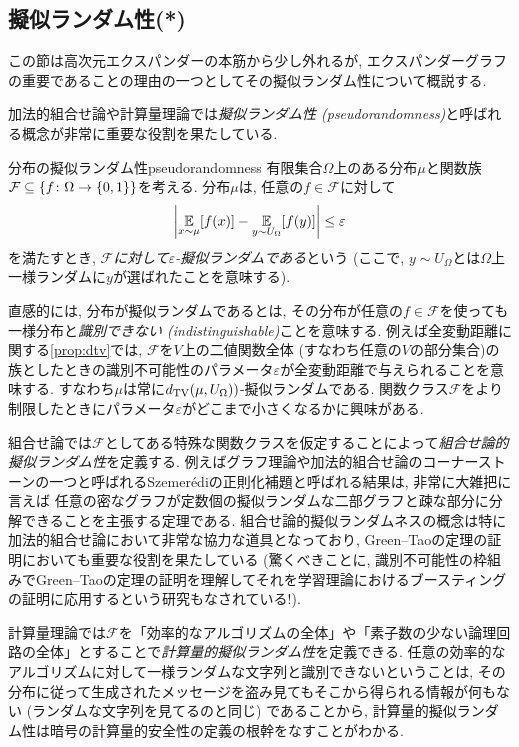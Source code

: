 \subsection{擬似ランダム性(*)} \label{sec:expander pseudorandom}
この節は高次元エクスパンダーの本筋から少し外れるが,
エクスパンダーグラフの重要であることの理由の一つとしてその擬似ランダム性について概説する.

加法的組合せ論や計算量理論では\emph{擬似ランダム性 (pseudorandomness)}と呼ばれる概念が非常に重要な役割を果たしている.
\begin{definition}{分布の擬似ランダム性}{pseudorandomness}
    有限集合$\Omega$上のある分布$\mu$と関数族$\mathcal{F} \subseteq \{f\colon \Omega \to \{0,1\}\}$を考える.
    分布$\mu$は,
    任意の$f\in \mathcal{F}$に対して
    \[ \left\lvert\operatorname*{\mathbb{E}}_{x\sim \mu} [f(x)] - \operatorname*{\mathbb{E}}_{y\sim U_{\Omega}}[f(y)]\right\rvert \le \varepsilon\]
    を満たすとき, \emph{$\mathcal{F}$に対して$\varepsilon$-擬似ランダムである}という (ここで, $y\sim U_\Omega$とは$\Omega$上一様ランダムに$y$が選ばれたことを意味する).
\end{definition}
直感的には, 分布が擬似ランダムであるとは, その分布が任意の$f\in \mathcal{F}$を使っても一様分布と\emph{識別できない (indistinguishable)}ことを意味する.
例えば全変動距離に関する\cref{prop:dtv}では, $\mathcal{F}$を$V$上の二値関数全体 (すなわち任意の$V$の部分集合)の族としたときの識別不可能性のパラメータ$\varepsilon$が全変動距離で与えられることを意味する.
すなわち$\mu$は常に$d_{\mathrm{TV}}(\mu,U_{\Omega}))$-擬似ランダムである.
関数クラス$\mathcal{F}$をより制限したときにパラメータ$\varepsilon$がどこまで小さくなるかに興味がある.

組合せ論では$\mathcal{F}$としてある特殊な関数クラスを仮定することによって\emph{組合せ論的擬似ランダム性}を定義する.
例えばグラフ理論や加法的組合せ論のコーナーストーンの一つと呼ばれるSzemerédiの正則化補題と呼ばれる結果は, 非常に大雑把に言えば
任意の密なグラフが定数個の擬似ランダムな二部グラフと疎な部分に分解できることを主張する定理である.
組合せ論的擬似ランダムネスの概念は特に加法的組合せ論において非常な協力な道具となっており,
Green--Taoの定理の証明においても重要な役割を果たしている
(驚くべきことに, 識別不可能性の枠組みでGreen--Taoの定理の証明を理解してそれを学習理論におけるブースティングの証明に応用するという研究もなされている!).

計算量理論では$\mathcal{F}$を「効率的なアルゴリズムの全体」や「素子数の少ない論理回路の全体」とすることで\emph{計算量的擬似ランダム性}を定義できる.
任意の効率的なアルゴリズムに対して一様ランダムな文字列と識別できないということは, その分布に従って生成されたメッセージを盗み見てもそこから得られる情報が何もない (ランダムな文字列を見てるのと同じ) であることから, 計算量的擬似ランダム性は暗号の計算量的安全性の定義の根幹をなすことがわかる.

